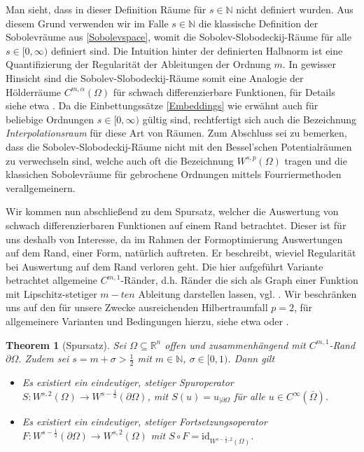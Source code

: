 \documentclass[bibliography=totoc,12pt,a4paper]{scrartcl}
\theoremstyle{exampstyle}
\newtheorem{theorem}[defi]{Theorem}
\numberwithin{equation}{section}
\begin{document}
Man sieht, dass in dieser Definition Räume für $s \in \mathbb{N}$ nicht definiert wurden. Aus diesem Grund verwenden wir im Falle $s \in \mathbb{N}$ die klassische Definition der Sobolevräume aus \ref{Sobolevspace}, womit die Sobolev-Slobodeckij-Räume für alle $s\in [0,\infty)$
definiert sind. Die Intuition hinter der definierten Halbnorm ist eine Quantifizierung der Regularität der Ableitungen der Ordnung $m$. In gewisser Hinsicht sind die Sobolev-Slobodeckij-Räume somit eine Analogie der Hölderräume $C^{m, \alpha}(\Omega)$ für schwach differenzierbare Funktionen, für Details siehe etwa \cite{brokenSobolev}. Da die Einbettungssätze \ref{Embeddings} wie erwähnt auch für beliebige Ordnungen $s\in [0,\infty)$ gültig sind, rechtfertigt sich auch die Bezeichnung \textit{Interpolationsraum} für diese Art von Räumen. Zum Abschluss sei zu bemerken, dass die Sobolev-Slobodeckij-Räume nicht mit den Bessel'schen Potentialräumen zu verwechseln sind, welche auch oft die Bezeichnung $W^{s,p}(\Omega)$ tragen und die klassichen Sobolevräume für gebrochene Ordnungen mittels Fourriermethoden verallgemeinern.

Wir kommen nun abschließend zu dem Spursatz, welcher die Auswertung von schwach differenzierbaren Funktionen auf einem Rand betrachtet. Dieser ist für uns deshalb von Interesse, da im Rahmen der Formoptimierung Auswertungen auf dem Rand, einer Form, natürlich auftreten. Er beschreibt, wieviel Regularität bei Auswertung auf dem Rand verloren geht. Die hier aufgeführt Variante betrachtet allgemeine $C^{m,1}$-Ränder, d.h. Ränder die sich als Graph einer Funktion mit Lipschitz-stetiger $m-ten$ Ableitung darstellen lassen, vgl. \cite{brokenSobolev}. Wir beschränken uns auf den für unsere Zwecke ausreichenden Hilbertraumfall $p=2$, für allgemeinere Varianten und Bedingungen hierzu, siehe etwa \cite{tracetheorem} oder \cite{brokenSobolev}.


\begin{theorem}[Spursatz]
	Sei $\Omega \subseteq \mathbb{R}^n$ offen und zusammenhängend mit $C^{m,1}$-Rand $\partial\Omega$.
	Zudem sei $s = m + \sigma > \frac{1}{2}$ mit $m\in\mathbb{N}$, $\sigma\in[0,1)$. Dann gilt
	\begin{itemize}
		\item[(i)]	Es existiert ein eindeutiger, stetiger Spuroperator $S: W^{s,2}(\Omega) \rightarrow W^{s-\frac{1}{2}}(\partial\Omega)$, mit $S(u) = u_{\vert \partial \Omega}$ für alle $u\in C^\infty(\bar{\Omega})$.
		\item[(ii)] Es existiert ein eindeutiger, stetiger Fortsetzungsoperator \newline $F: W^{s-\frac{1}{2}}(\partial\Omega) \rightarrow  W^{s,2}(\Omega)$ mit $S\circ F = \text{id}_{W^{s-\frac{1}{2},2}(\Omega)}$.
	\end{itemize}
\end{theorem}
\end{document}
